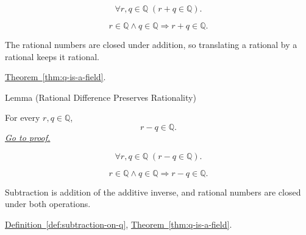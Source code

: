 \begin{remark*}
\[
\forall r,q\in\mathbb{Q}\;(r+q\in\mathbb{Q}).
\]
\end{remark*}

\begin{remark*}
\[
r\in\mathbb{Q}\land q\in\mathbb{Q}\Longrightarrow r+q\in\mathbb{Q}.
\]
\end{remark*}

\begin{remark*}[Interpretation]
The rational numbers are closed under addition, so translating a rational by a
rational keeps it rational.
\end{remark*}

\begin{dependencies}
\hyperref[thm:q-is-a-field]{Theorem~\ref*{thm:q-is-a-field}}.
\end{dependencies}

\begin{lemmabox}{Lemma (Rational Difference Preserves Rationality)}
\begin{lemma}
\label{lem:rational-difference-preserves-rationality}
For every $r,q\in\mathbb{Q}$,
\[
  r-q\in\mathbb{Q}.
\]
\hyperref[prf:rational-difference-preserves-rationality]{\textit{Go to proof.}}
\end{lemma}
\end{lemmabox}

\begin{remark*}
\[
\forall r,q\in\mathbb{Q}\;(r-q\in\mathbb{Q}).
\]
\end{remark*}

\begin{remark*}
\[
r\in\mathbb{Q}\land q\in\mathbb{Q}\Longrightarrow r-q\in\mathbb{Q}.
\]
\end{remark*}

\begin{remark*}[Interpretation]
Subtraction is addition of the additive inverse, and rational numbers are
closed under both operations.
\end{remark*}

\begin{dependencies}
\hyperref[def:subtraction-on-q]{Definition~\ref*{def:subtraction-on-q}},
\hyperref[thm:q-is-a-field]{Theorem~\ref*{thm:q-is-a-field}}.
\end{dependencies}


